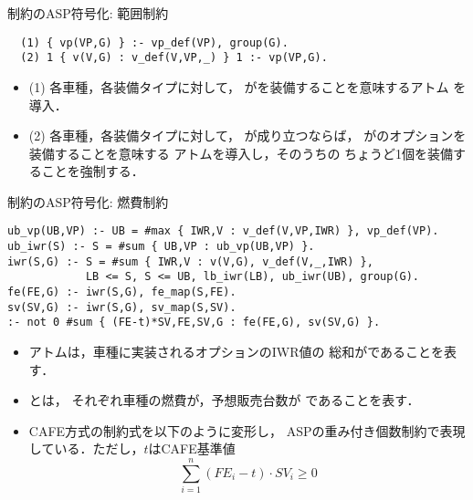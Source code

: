 \documentclass[dvipdfmx, 11pt]{beamer}
\begin{document}
\begin{frame}[fragile]{制約のASP符号化: 範囲制約}
 \begin{center} 
 \end{center}

\vfill
\begin{exampleblock}{}
\begin{lstlisting}
  (1) { vp(VP,G) } :- vp_def(VP), group(G). 
  (2) 1 { v(V,G) : v_def(V,VP,_) } 1 :- vp(VP,G).
\end{lstlisting}
\end{exampleblock}
\vfill
\begin{itemize}
\item (1)
  各車種，各装備タイプに対して，
  がを装備することを意味するアトム
  を導入．
\item (2)
  各車種，各装備タイプに対して，
  が成り立つならば，
  がのオプションを装備することを意味する
  アトムを導入し，そのうちの
  ちょうど1個を装備することを強制する．
\end{itemize}
\end{frame}
\begin{frame}[fragile]{制約のASP符号化: 燃費制約}
\begin{exampleblock}{}\small
\begin{lstlisting}
ub_vp(UB,VP) :- UB = #max { IWR,V : v_def(V,VP,IWR) }, vp_def(VP).
ub_iwr(S) :- S = #sum { UB,VP : ub_vp(UB,VP) }.
iwr(S,G) :- S = #sum { IWR,V : v(V,G), v_def(V,_,IWR) },
            LB <= S, S <= UB, lb_iwr(LB), ub_iwr(UB), group(G).
fe(FE,G) :- iwr(S,G), fe_map(S,FE).
sv(SV,G) :- iwr(S,G), sv_map(S,SV).
:- not 0 #sum { (FE-t)*SV,FE,SV,G : fe(FE,G), sv(SV,G) }.
\end{lstlisting}
\end{exampleblock}
\vfill
\begin{itemize}
 \item アトムは，車種に実装されるオプションのIWR値の
       総和がであることを表す．
 \item {}とは，
       それぞれ車種の燃費が，予想販売台数が
       であることを表す．
 \item CAFE方式の制約式を以下のように変形し，
       ASPの重み付き個数制約で表現している．ただし，$t$はCAFE基準値
       \[\sum_{i=1}^{n} (FE_{i}-t)\cdot SV_{i} \geq 0\]
\end{itemize}
\end{frame}
\end{document}
